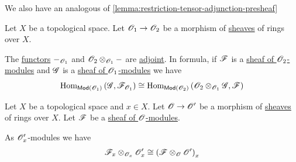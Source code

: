 \documentclass[../../../main]{subfiles}
\begin{document}
We also have an analogous of \autoref{lemma:restriction-tensor-adjunction-presheaf}
\begin{lemma} \label{lemma:restriction-tensor-adjunction-sheaf}
  Let \(X\) be a topological space.
  Let \(\mathscr{O}_{1} \to \mathscr{O}_{2}\) be a morphism of \hyperref[def:sheaf]{sheaves} of rings over \(X\).

  The \hyperref[def:functor]{functors} \(-_{\mathscr{O}_{1}}\) and \(\mathscr{O}_{2} \otimes_{\mathscr{O}_{1}} -\) are \hyperref[def:adjoint-functors]{adjoint}.
  In formula, if \(\mathscr{F}\) is a \hyperref[def:sheaf-of-modules]{sheaf of \(\mathscr{O}_{2}\)-modules} and \(\mathscr{G}\) is a \hyperref[def:sheaf-of-modules]{sheaf of \(\mathscr{O}_{1}\)-modules} we have
  \begin{equation*}
    \operatorname{Hom}_{\mathsf{Mod}(\mathscr{O}_{1})} \left( \mathscr{G}, \mathscr{F}_{\mathscr{O}_{1}} \right) \cong \operatorname{Hom}_{\mathsf{Mod}(\mathscr{O}_{2})} \left( \mathscr{O}_{2} \otimes_{\mathscr{O}_{1}} \mathscr{G}, \mathscr{F} \right)
  \end{equation*}
\end{lemma}

\begin{lemma}
  Let \(X\) be a topological space and \(x \in X\).
  Let \(\mathscr{O} \to \mathscr{O}'\) be a morphism of \hyperref[def:sheaf]{sheaves} of rings over \(X\).
  Let \(\mathscr{F}\) be a \hyperref[def:sheaf-of-modules]{sheaf of \(\mathscr{O}\)-modules}.

  As \(\mathscr{O}'_{x}\)-modules we have
  \begin{align*}
    \mathscr{F}_{x} \otimes_{\mathscr{O}_{x}} \mathscr{O}'_{x} \cong \left( \mathscr{F} \otimes_{\mathscr{O}} \mathscr{O}' \right)_{x}
  \end{align*}
\end{lemma}
\end{document}

